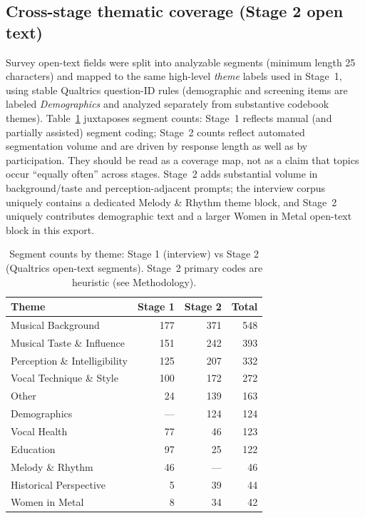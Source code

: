 \documentclass{article}
\begin{document}
\subsection{Cross-stage thematic coverage (Stage 2 open text)}
Survey open-text fields were split into analyzable segments (minimum length 25 characters) and mapped to the same high-level \emph{theme} labels used in Stage~1, using stable Qualtrics question-ID rules (demographic and screening items are labeled \emph{Demographics} and analyzed separately from substantive codebook themes).
Table~\ref{tab:crossstagethemes} juxtaposes segment counts: Stage~1 reflects manual (and partially assisted) segment coding; Stage~2 counts reflect automated segmentation volume and are driven by response length as well as by participation.
They should be read as a coverage map, not as a claim that topics occur ``equally often'' across stages.
Stage~2 adds substantial volume in background/taste and perception-adjacent prompts; the interview corpus uniquely contains a dedicated Melody \& Rhythm theme block, and Stage~2 uniquely contributes demographic text and a larger Women in Metal open-text block in this export.

\begin{table}[ht]
\centering
\caption{Segment counts by theme: Stage 1 (interview) vs Stage 2 (Qualtrics open-text segments). Stage~2 primary codes are heuristic (see Methodology).}
\label{tab:crossstagethemes}
\small
\begin{tabular}{lrrr}
\toprule
Theme & Stage 1 & Stage 2 & Total \\
\midrule
Musical Background & 177 & 371 & 548 \\
Musical Taste \& Influence & 151 & 242 & 393 \\
Perception \& Intelligibility & 125 & 207 & 332 \\
Vocal Technique \& Style & 100 & 172 & 272 \\
Other & 24 & 139 & 163 \\
Demographics & --- & 124 & 124 \\
Vocal Health & 77 & 46 & 123 \\
Education & 97 & 25 & 122 \\
Melody \& Rhythm & 46 & --- & 46 \\
Historical Perspective & 5 & 39 & 44 \\
Women in Metal & 8 & 34 & 42 \\
\bottomrule
\end{tabular}
\end{table}
\end{document}
